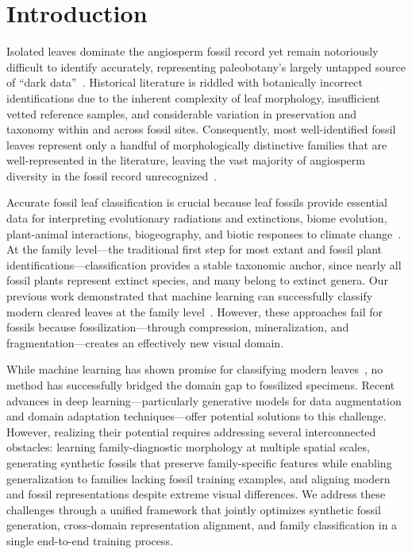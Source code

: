 \documentclass[pdflatex,lineno,sn-nature]{sn-jnl}%
\theoremstyle{plain}%
\theoremstyle{definition}%
\theoremstyle{remark}%
\begin{document}
\maketitle

\section*{Introduction}

Isolated leaves dominate the angiosperm fossil record yet remain notoriously difficult to identify accurately, representing paleobotany's largely untapped source of ``dark data''~\citep{Dilcher_1971}. Historical literature is riddled with botanically incorrect identifications due to the inherent complexity of leaf morphology, insufficient vetted reference samples, and considerable variation in preservation and taxonomy within and across fossil sites. Consequently, most well-identified fossil leaves represent only a handful of morphologically distinctive families that are well-represented in the literature, leaving the vast majority of angiosperm diversity in the fossil record unrecognized~\citep{Hickey1975, Wilf2008FossilLeaves}. 

Accurate fossil leaf classification is crucial because leaf fossils provide essential data for interpreting evolutionary radiations and extinctions, biome evolution, plant-animal interactions, biogeography, and biotic responses to climate change~\citep{Giraldo2025, Hickey1977, Johnson1989, Kooyman2014, Wing2005}. At the family level---the traditional first step for most extant and fossil plant identifications---classification provides a stable taxonomic anchor, since nearly all fossil plants represent extinct species, and many belong to extinct genera. Our previous work demonstrated that machine learning can successfully classify modern cleared leaves at the family level~\citep{wilf2016leaves}. However, these approaches fail for fossils because fossilization—through compression, mineralization, and fragmentation—creates an effectively new visual domain.

While machine learning has shown promise for classifying modern leaves~\citep{wilf2016leaves, Barre2017LeafNet,machinelearningspecies,Adaime2024}, no method has successfully bridged the domain gap to fossilized specimens. Recent advances in deep learning—particularly generative models for data augmentation and domain adaptation techniques---offer potential solutions to this challenge. However, realizing their potential requires addressing several interconnected obstacles: learning family-diagnostic morphology at multiple spatial scales, generating synthetic fossils that preserve family-specific features while enabling generalization to families lacking fossil training examples, and aligning modern and fossil representations despite extreme visual differences. We address these challenges through a unified framework that jointly optimizes synthetic fossil generation, cross-domain representation alignment, and family classification in a single end-to-end training process.
\end{document}
